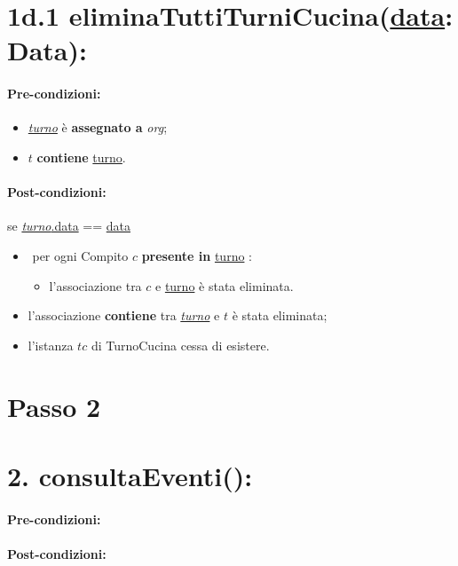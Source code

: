 \section*{1d.1 eliminaTuttiTurniCucina(\underline{data}: Data):}

\paragraph{Pre-condizioni:}

\begin{itemize}
 \item \underline{\textit{turno}} è \textbf{assegnato a} {\textit{org}};
 \item $t$ \textbf{contiene} \underline{turno}.
\end{itemize}

\paragraph{Post-condizioni:}  se \underline{\textit{turno}.data} == \underline{data}

\begin{itemize}
   \item \textlangle $ $ per ogni Compito $c$ \textbf{presente in} \underline{turno} \textrangle:
    \begin{itemize}
        \item l'associazione tra $c$ e \underline{turno} è stata eliminata.
    \end{itemize}
    \item l'associazione \textbf{contiene} tra \underline{\textit{turno}} e $t$ è stata eliminata;
    \item l'istanza $tc$ di TurnoCucina cessa di esistere.
\end{itemize}

\section{Passo 2}
\section*{2. consultaEventi():}

\paragraph{Pre-condizioni:}

\paragraph{Post-condizioni:}

